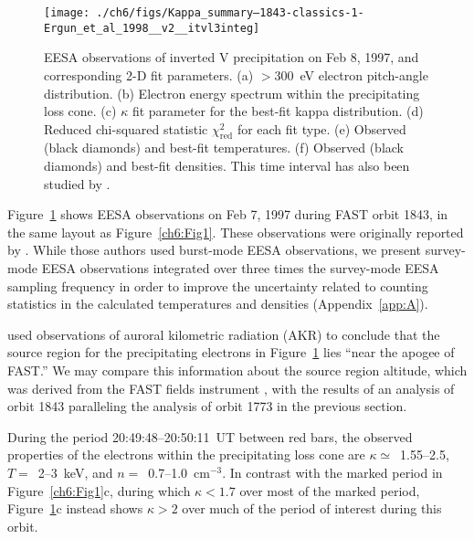   \begin{figure}
    \centering
    \noindent\texttt{[image: ./ch6/figs/Kappa\_summary--1843-classics-1-Ergun\_et\_al\_1998\_\_v2\_\_itvl3integ]}
    \caption[Inverted V precipitation and best-fit Maxwellian and kappa
    distribution parameters (Orbit 1843)]{EESA observations of inverted V
      precipitation on Feb 8, 1997, and corresponding 2-D fit parameters. (a)
      $>$300~eV electron pitch-angle distribution. (b) Electron energy spectrum
      within the precipitating loss cone. (c) $\kappa$ fit parameter for the
      best-fit kappa distribution. (d) Reduced chi-squared statistic
      $\chi^2_{\mathrm{red}}$ for each fit type. (e) Observed (black diamonds)
      and best-fit temperatures. (f) Observed (black diamonds) and best-fit
      densities. This time interval has also been studied by
      \citet{Ergun1998a,Ergun1998}.}

    \label{ch6:Fig4}
  \end{figure}


  Figure~\ref{ch6:Fig4} shows EESA observations on Feb 7, 1997 during FAST orbit
  1843, in the same layout as Figure~\ref{ch6:Fig1}. These observations were
  originally reported by \citet{Ergun1998a,Ergun1998}. While those authors used
  burst-mode EESA observations, we present survey-mode EESA observations
  integrated over three times the survey-mode EESA sampling frequency in order
  to improve the uncertainty related to counting statistics in the calculated
  temperatures and densities (Appendix~\ref{app:A}).

  \citet{Ergun1998} used observations of auroral kilometric radiation (AKR) to
  conclude that the source region for the precipitating electrons in
  Figure~\ref{ch6:Fig4} lies ``near the apogee of FAST.''  We may compare this
  information about the source region altitude, which was derived from the FAST
  fields instrument \citep{Ergun2001}, with the results of an analysis of orbit
  1843 paralleling the analysis of orbit 1773 in the previous section.

  During the period 20:49:48--20:50:11~UT between red bars, the observed
  properties of the electrons within the precipitating loss cone are $\kappa
  \simeq $~1.55--2.5, $T =$~2--3~keV, and $n =$~0.7--1.0~cm$^{-3}$. In contrast
  with the marked period in Figure~\ref{ch6:Fig1}c, during which $\kappa < 1.7$
  over most of the marked period, Figure~\ref{ch6:Fig4}c instead shows $\kappa >
  2$ over much of the period of interest during this orbit.


